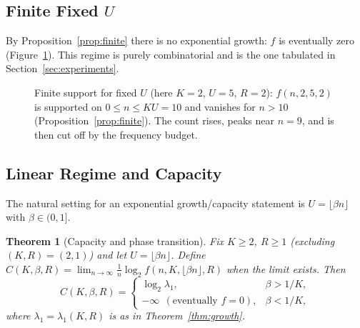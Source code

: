 \documentclass[a4paper,12pt]{article}
\newtheorem{theorem}{Theorem}
\begin{document}
\subsection{Finite Fixed $U$}

By Proposition~\ref{prop:finite} there is no exponential growth: $f$ is
eventually zero (Figure~\ref{fig:finite}).  This regime is purely
combinatorial and is the one tabulated in
Section~\ref{sec:experiments}.

\begin{figure}[H]
\centering
{}
\caption{Finite support for fixed $U$ (here $K=2$, $U=5$, $R=2$):
$f(n,2,5,2)$ is supported on $0\le n\le KU=10$ and vanishes for
$n>10$ (Proposition~\ref{prop:finite}). The count rises, peaks near
$n=9$, and is then cut off by the frequency budget.}
\label{fig:finite}
\end{figure}

\subsection{Linear Regime and Capacity}

The natural setting for an exponential growth/capacity statement is
$U=\lfloor\beta n\rfloor$ with $\beta\in(0,1]$.

\begin{theorem}[Capacity and phase transition]\label{thm:capacity}
Fix $K\ge2$, $R\ge1$ (excluding $(K,R)=(2,1)$) and let
$U=\lfloor\beta n\rfloor$.  Define
$C(K,\beta,R)=\lim_{n\to\infty}\tfrac1n\log_2 f(n,K,\lfloor\beta
n\rfloor,R)$ when the limit exists.  Then
\begin{equation}
C(K,\beta,R)=
\begin{cases}
\log_2\lambda_1, & \beta>1/K,\\[2pt]
-\infty\ \ (\text{eventually } f=0), & \beta<1/K,
\end{cases}
\end{equation}
where $\lambda_1=\lambda_1(K,R)$ is as in Theorem~\ref{thm:growth}.
\end{theorem}
\end{document}
